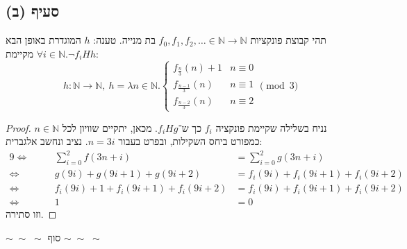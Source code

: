\documentclass[]{article}
\newcommand\N     {\mathbb{N}}
\newcommand\final {\begin{center}
		$\sim \; \sim \; \sim $ סוף $ \sim \; \sim \; \sim $
	\end{center}}
\begin{document}
	\subsection*{סעיף (ב)}
	תהי קבוצת פונקציות $ f_0, f_1, f_2, \dots \in \N \to \N $ בת מנייה. טענה: $ h $ המוגדרת באופן הבא מקיימת $ \forall i \in \N. \lnot f_iHh $: 
	\[ h \colon \N \to \N, \ h = \lambda n \in \N. \begin{cases}
		f_{\tfrac{n}{3}}(n) + 1 &n \equiv 0 \\
		f_{\tfrac{n - 1}{3}}(n) &n \equiv 1 \\
		f_{\tfrac{n - 2}{3}}(n) &n \equiv 2
	\end{cases} \pmod 3 \]
	\begin{proof}
		נניח בשלילה שקיימת פונקציה $ f_i $ כך ש־$ f_iHg $. מכאן, יתקיים שוויון לכל $ n \in \N $ כמפורט ביחס השקילות, ובפרט בעבור $ n = 3i $. נציב ונחשב אלגברית: 
		\begin{alignat}{9}
			\iff \quad &&\sum_{i = 0}^2 f(3n + i) &= \sum_{i = 0}^{2} g(3n + i) \\
			\iff \quad &&g(9i) + g(9i + 1) + g(9i + 2) &= f_i(9i) + f_i(9i + 1) + f_i(9i + 2) \\
			\iff \quad &&f_i(9i) + 1 + f_i(9i + 1) + f_i(9i + 2) &= f_i(9i) + f_i(9i + 1) + f_i(9i + 2) \\
			\iff \quad &&1 &= 0
		\end{alignat}
	וזו סתירה. 
	\end{proof}
	\final
\end{document}
